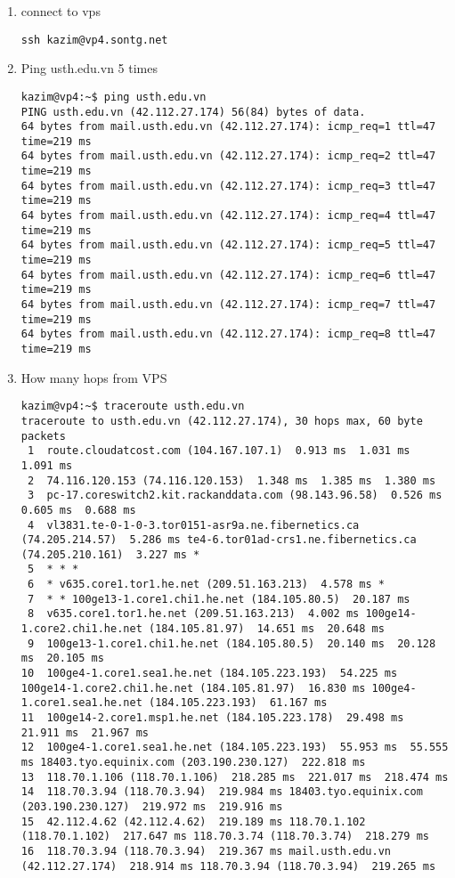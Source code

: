 \documentclass{article}
\begin{document}
\begin{enumerate}

\item connect to vps
\begin{verbatim} 
ssh kazim@vp4.sontg.net
\end{verbatim}

\item Ping usth.edu.vn 5 times
\begin{verbatim}    
kazim@vp4:~$ ping usth.edu.vn
PING usth.edu.vn (42.112.27.174) 56(84) bytes of data.
64 bytes from mail.usth.edu.vn (42.112.27.174): icmp_req=1 ttl=47 time=219 ms
64 bytes from mail.usth.edu.vn (42.112.27.174): icmp_req=2 ttl=47 time=219 ms
64 bytes from mail.usth.edu.vn (42.112.27.174): icmp_req=3 ttl=47 time=219 ms
64 bytes from mail.usth.edu.vn (42.112.27.174): icmp_req=4 ttl=47 time=219 ms
64 bytes from mail.usth.edu.vn (42.112.27.174): icmp_req=5 ttl=47 time=219 ms
64 bytes from mail.usth.edu.vn (42.112.27.174): icmp_req=6 ttl=47 time=219 ms
64 bytes from mail.usth.edu.vn (42.112.27.174): icmp_req=7 ttl=47 time=219 ms
64 bytes from mail.usth.edu.vn (42.112.27.174): icmp_req=8 ttl=47 time=219 ms
\end{verbatim}

\item How many hops from VPS
\begin{verbatim}
kazim@vp4:~$ traceroute usth.edu.vn
traceroute to usth.edu.vn (42.112.27.174), 30 hops max, 60 byte packets
 1  route.cloudatcost.com (104.167.107.1)  0.913 ms  1.031 ms  1.091 ms
 2  74.116.120.153 (74.116.120.153)  1.348 ms  1.385 ms  1.380 ms
 3  pc-17.coreswitch2.kit.rackanddata.com (98.143.96.58)  0.526 ms  0.605 ms  0.688 ms
 4  vl3831.te-0-1-0-3.tor0151-asr9a.ne.fibernetics.ca (74.205.214.57)  5.286 ms te4-6.tor01ad-crs1.ne.fibernetics.ca (74.205.210.161)  3.227 ms *
 5  * * *
 6  * v635.core1.tor1.he.net (209.51.163.213)  4.578 ms *
 7  * * 100ge13-1.core1.chi1.he.net (184.105.80.5)  20.187 ms
 8  v635.core1.tor1.he.net (209.51.163.213)  4.002 ms 100ge14-1.core2.chi1.he.net (184.105.81.97)  14.651 ms  20.648 ms
 9  100ge13-1.core1.chi1.he.net (184.105.80.5)  20.140 ms  20.128 ms  20.105 ms
10  100ge4-1.core1.sea1.he.net (184.105.223.193)  54.225 ms 100ge14-1.core2.chi1.he.net (184.105.81.97)  16.830 ms 100ge4-1.core1.sea1.he.net (184.105.223.193)  61.167 ms
11  100ge14-2.core1.msp1.he.net (184.105.223.178)  29.498 ms  21.911 ms  21.967 ms
12  100ge4-1.core1.sea1.he.net (184.105.223.193)  55.953 ms  55.555 ms 18403.tyo.equinix.com (203.190.230.127)  222.818 ms
13  118.70.1.106 (118.70.1.106)  218.285 ms  221.017 ms  218.474 ms
14  118.70.3.94 (118.70.3.94)  219.984 ms 18403.tyo.equinix.com (203.190.230.127)  219.972 ms  219.916 ms
15  42.112.4.62 (42.112.4.62)  219.189 ms 118.70.1.102 (118.70.1.102)  217.647 ms 118.70.3.74 (118.70.3.74)  218.279 ms
16  118.70.3.94 (118.70.3.94)  219.367 ms mail.usth.edu.vn (42.112.27.174)  218.914 ms 118.70.3.94 (118.70.3.94)  219.265 ms
\end{verbatim}


\end{enumerate}
\end{document}

